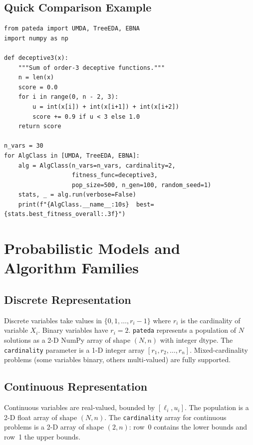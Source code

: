 \documentclass[a4paper,11pt]{article}
\begin{document}
\subsection{Quick Comparison Example}

\begin{lstlisting}
from pateda import UMDA, TreeEDA, EBNA
import numpy as np

def deceptive3(x):
    """Sum of order-3 deceptive functions."""
    n = len(x)
    score = 0.0
    for i in range(0, n - 2, 3):
        u = int(x[i]) + int(x[i+1]) + int(x[i+2])
        score += 0.9 if u < 3 else 1.0
    return score

n_vars = 30
for AlgClass in [UMDA, TreeEDA, EBNA]:
    alg = AlgClass(n_vars=n_vars, cardinality=2,
                   fitness_func=deceptive3,
                   pop_size=500, n_gen=100, random_seed=1)
    stats, _ = alg.run(verbose=False)
    print(f"{AlgClass.__name__:10s}  best={stats.best_fitness_overall:.3f}")
\end{lstlisting}

\section{Probabilistic Models and Algorithm Families}
\label{sec:models}

\subsection{Discrete Representation}

Discrete variables take values in $\{0, 1, \ldots, r_i - 1\}$ where $r_i$ is the cardinality of variable $X_i$.  Binary variables have $r_i = 2$.  \texttt{pateda} represents a population of $N$ solutions as a 2-D NumPy array of shape $(N, n)$ with integer dtype.  The \texttt{cardinality} parameter is a 1-D integer array $[r_1, r_2, \ldots, r_n]$.  Mixed-cardinality problems (some variables binary, others multi-valued) are fully supported.

\subsection{Continuous Representation}

Continuous variables are real-valued, bounded by $[\ell_i, u_i]$.  The population is a 2-D float array of shape $(N, n)$. The \texttt{cardinality} array for continuous problems is a 2-D array of shape $(2, n)$: row~0 contains the lower bounds and row~1 the upper bounds.
\end{document}

